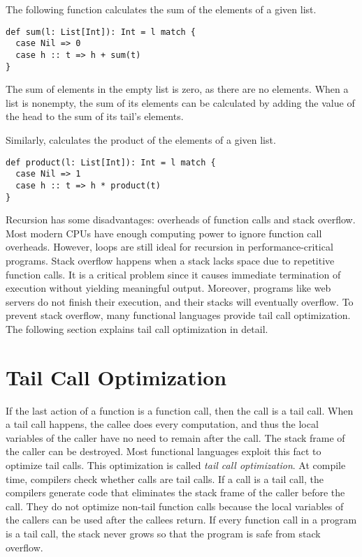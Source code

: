The following function calculates the sum of the elements of a given list.

\begin{verbatim}
def sum(l: List[Int]): Int = l match {
  case Nil => 0
  case h :: t => h + sum(t)
}
\end{verbatim}

The sum of elements in the empty list is zero, as there are no elements.
When a list is nonempty, the sum of its elements can be calculated by adding the
value of the head to the sum of its tail's elements.

Similarly,  calculates the product of the elements of a given
list.

\begin{verbatim}
def product(l: List[Int]): Int = l match {
  case Nil => 1
  case h :: t => h * product(t)
}
\end{verbatim}

Recursion has some disadvantages: overheads of function calls and stack
overflow. Most modern CPUs have enough computing power to ignore function call
overheads. However, loops are still ideal for recursion in performance-critical
programs. Stack overflow happens when a
stack lacks space due to repetitive function calls. It is a critical problem
since it causes immediate termination of execution without yielding meaningful
output. Moreover, programs like web servers do not finish their execution, and
their stacks will eventually overflow. To prevent stack overflow, many functional
languages provide tail call optimization.
The following section explains tail call optimization in detail.

\section{Tail Call Optimization}

If the last action of a function is a function call, then the call is a tail
call. When a tail call happens, the callee does every computation, and thus the
local variables of the caller have no need to remain after the call. The stack
frame of the caller can be destroyed. Most functional languages exploit this
fact to optimize tail calls. This optimization is called
\textit{tail call optimization}.
At compile time, compilers check whether calls are tail calls.
If a call is a tail call, the compilers generate code that eliminates the
stack frame of the caller before the call. They do not optimize non-tail function
calls because the local variables of the callers can be used after the callees
return. If every function call in a program is a tail call, the stack never
grows so that the program is safe from stack overflow.

